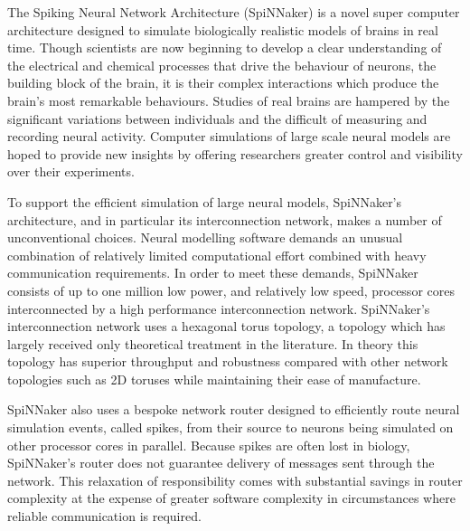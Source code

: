 %

The Spiking Neural Network Architecture (SpiNNaker) is a novel super computer
architecture designed to simulate biologically realistic models of brains in
real time. Though scientists are now beginning to develop a clear understanding
of the electrical and chemical processes that drive the behaviour of neurons,
the building block of the brain, it is their complex interactions which produce
the brain's most remarkable behaviours. Studies of real brains are hampered by
the significant variations between individuals and the difficult of measuring
and recording neural activity. Computer simulations of large scale neural
models are hoped to provide new insights by offering researchers greater
control and visibility over their experiments.

To support the efficient simulation of large neural models, SpiNNaker's
architecture, and in particular its interconnection network, makes a number of
unconventional choices. Neural modelling software demands an unusual
combination of relatively limited computational effort combined with heavy
communication requirements. In order to meet these demands, SpiNNaker consists
of up to one million low power, and relatively low speed, processor cores
interconnected by a high performance interconnection network. SpiNNaker's
interconnection network uses a hexagonal torus topology, a topology which has
largely received only theoretical treatment in the literature. In theory this
topology has superior throughput and robustness compared with other network
topologies such as 2D toruses while maintaining their ease of manufacture.

SpiNNaker also uses a bespoke network router designed to efficiently route
neural simulation events, called spikes, from their source to neurons being
simulated on other processor cores in parallel. Because spikes are often lost
in biology, SpiNNaker's router does not guarantee delivery of messages sent
through the network. This relaxation of responsibility comes with substantial
savings in router complexity at the expense of greater software complexity in
circumstances where reliable communication is required.

%

